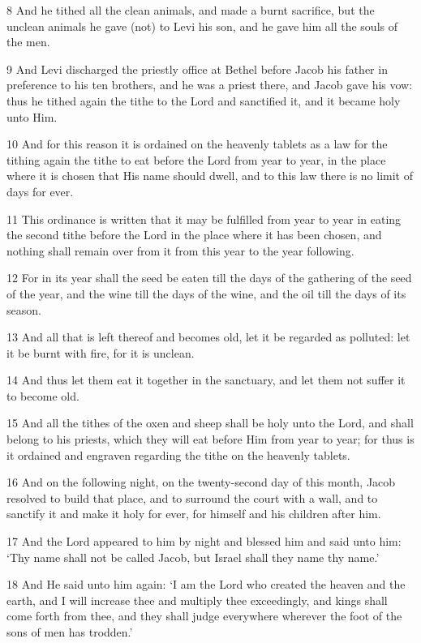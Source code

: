 \par 8 And he tithed all the clean animals, and made a burnt sacrifice, but the unclean animals he gave (not) to Levi his son, and he gave him all the souls of the men.
\par 9 And Levi discharged the priestly office at Bethel before Jacob his father in preference to his ten brothers, and he was a priest there, and Jacob gave his vow: thus he tithed again the tithe to the Lord and sanctified it, and it became holy unto Him.
\par 10 And for this reason it is ordained on the heavenly tablets as a law for the tithing again the tithe to eat before the Lord from year to year, in the place where it is chosen that His name should dwell, and to this law there is no limit of days for ever.
\par 11 This ordinance is written that it may be fulfilled from year to year in eating the second tithe before the Lord in the place where it has been chosen, and nothing shall remain over from it from this year to the year following.
\par 12 For in its year shall the seed be eaten till the days of the gathering of the seed of the year, and the wine till the days of the wine, and the oil till the days of its season.
\par 13 And all that is left thereof and becomes old, let it be regarded as polluted: let it be burnt with fire, for it is unclean.
\par 14 And thus let them eat it together in the sanctuary, and let them not suffer it to become old.
\par 15 And all the tithes of the oxen and sheep shall be holy unto the Lord, and shall belong to his priests, which they will eat before Him from year to year; for thus is it ordained and engraven regarding the tithe on the heavenly tablets.
\par 16 And on the following night, on the twenty-second day of this month, Jacob resolved to build that place, and to surround the court with a wall, and to sanctify it and make it holy for ever, for himself and his children after him.
\par 17 And the Lord appeared to him by night and blessed him and said unto him: ‘Thy name shall not be called Jacob, but Israel shall they name thy name.’
\par 18 And He said unto him again: ‘I am the Lord who created the heaven and the earth, and I will increase thee and multiply thee exceedingly, and kings shall come forth from thee, and they shall judge everywhere wherever the foot of the sons of men has trodden.’
